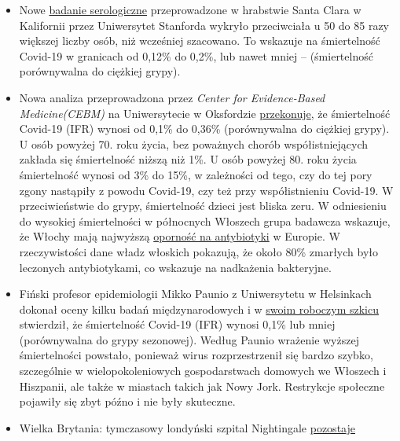 \begin{itemize}
\tightlist
\item
  Nowe
  \href{https://www.medrxiv.org/content/10.1101/2020.04.14.20062463v1}{badanie
  serologiczne} przeprowadzone w hrabstwie Santa Clara w Kalifornii
  przez Uniwersytet Stanforda wykryło przeciwciała u 50 do 85 razy
  większej liczby osób, niż wcześniej szacowano. To wskazuje na
  śmiertelność Covid-19 w granicach od 0,12\% do 0,2\%, lub nawet mniej
  -- (śmiertelność porównywalna do ciężkiej grypy).
\item
  Nowa analiza przeprowadzona przez \emph{Center for Evidence-Based
  Medicine(CEBM)} na Uniwersytecie w Oksfordzie
  \href{https://www.cebm.net/covid-19/global-covid-19-case-fatality-rates/}{przekonuje},
  że śmiertelność Covid-19 (IFR) wynosi od 0,1\% do 0,36\% (porównywalna
  do ciężkiej grypy). U osób powyżej 70. roku życia, bez poważnych
  chorób współistniejących zakłada się śmiertelność niższą niż 1\%. U
  osób powyżej 80. roku życia śmiertelność wynosi od 3\% do 15\%, w
  zależności od tego, czy do tej pory zgony nastąpiły z powodu Covid-19,
  czy też przy współistnieniu Covid-19. W przeciwieństwie do grypy,
  śmiertelność dzieci jest bliska zeru. W odniesieniu do wysokiej
  śmiertelności w północnych Włoszech grupa badawcza wskazuje, że Włochy
  mają najwyższą
  \href{https://www.ansa.it/english/news/science_tecnology/2019/11/19/italy-top-in-eu-in-antibiotic-resistance_369e0123-0107-445e-8c17-f11932c9d27c.html}{oporność
  na antybiotyki} w Europie. W rzeczywistości dane władz włoskich
  pokazują, że około 80\% zmarłych było leczonych antybiotykami, co
  wskazuje na nadkażenia bakteryjne.
\item
  Fiński profesor epidemiologii Mikko Paunio z Uniwersytetu w Helsinkach
  dokonał oceny kilku badań międzynarodowych i w
  \href{https://lockdownsceptics.org/wp-content/uploads/2020/04/How-the-World-got-Fooled-by-COVID-ed-2c.pdf}{swoim
  roboczym szkicu} stwierdził, że śmiertelność Covid-19 (IFR) wynosi
  0,1\% lub mniej (porównywalna do grypy sezonowej). Według Paunio
  wrażenie wyższej śmiertelności powstało, ponieważ wirus
  rozprzestrzenił się bardzo szybko, szczególnie w wielopokoleniowych
  gospodarstwach domowych we Włoszech i Hiszpanii, ale także w miastach
  takich jak Nowy Jork. Restrykcje społeczne pojawiły się zbyt późno i
  nie były skuteczne.
\item
  Wielka Brytania: tymczasowy londyński szpital Nightingale
  \href{https://www.hsj.co.uk/service-design/exclusive-nightingale-largely-empty-as-icus-handle-surge/7027398.article}{pozostaje
}
\end{itemize}
